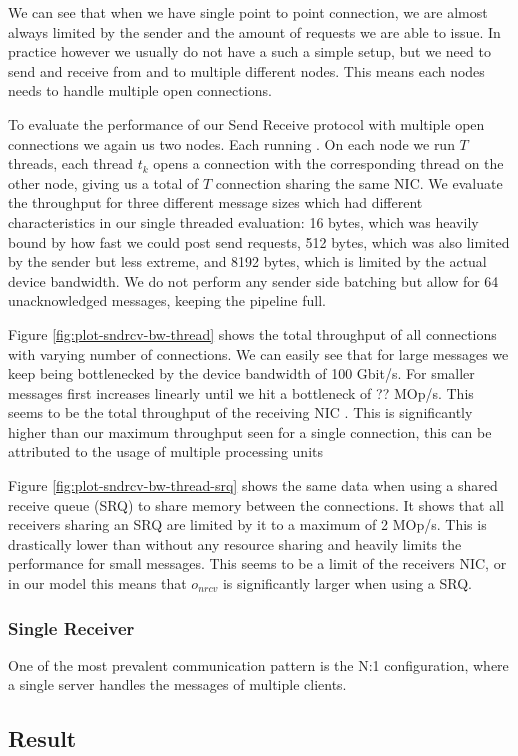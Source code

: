 We can see that when we have single point to point connection, we are almost always limited by the sender and the 
amount of requests we are able to issue. In practice however we usually do not have a such a simple setup, but we
need to send and receive from and to multiple different nodes. This means each nodes needs to handle multiple open
connections.

To evaluate the performance of our Send Receive protocol with multiple open connections we again us two nodes. Each 
running . On each node we run $T$ threads, each thread $t_k$ opens a connection with the corresponding 
thread on the other node, giving us a total of $T$ connection sharing the same NIC. We evaluate the throughput for 
three different message sizes which had different characteristics in our single threaded evaluation: 16 bytes, 
which was heavily bound by how fast we could post send requests, 512 bytes, which was also limited by the sender
but less extreme, and 8192 bytes, which is limited by the actual device bandwidth. We do not perform any sender side
batching but allow for 64 unacknowledged messages, keeping the pipeline full.


Figure \ref{fig:plot-sndrcv-bw-thread} shows the total throughput of all connections with varying number of connections.
We can easily see that for large messages we keep being bottlenecked by the device bandwidth of 100 Gbit/s. For smaller
messages first increases linearly until we hit a bottleneck of ?? MOp/s. This seems to be the total throughput of the 
receiving NIC . This is significantly higher than our maximum throughput seen for a single connection,
this can be attributed to the usage of multiple processing units~\cite{}


Figure \ref{fig:plot-sndrcv-bw-thread-srq} shows the same data when using a shared receive queue (SRQ) to share memory
between the connections. It shows that all receivers sharing an SRQ are limited by it to a maximum of 2 MOp/s. This is 
drastically lower than without any resource sharing and heavily limits the performance for small messages. This seems
to be a limit of the receivers NIC, or in our model this means that $o_{nrcv}$ is significantly larger when using a 
SRQ. 


\subsubsection{Single Receiver}

One of the most prevalent communication pattern is the N:1 configuration, where a single server handles the messages
of multiple clients.

\subsection{Result}



